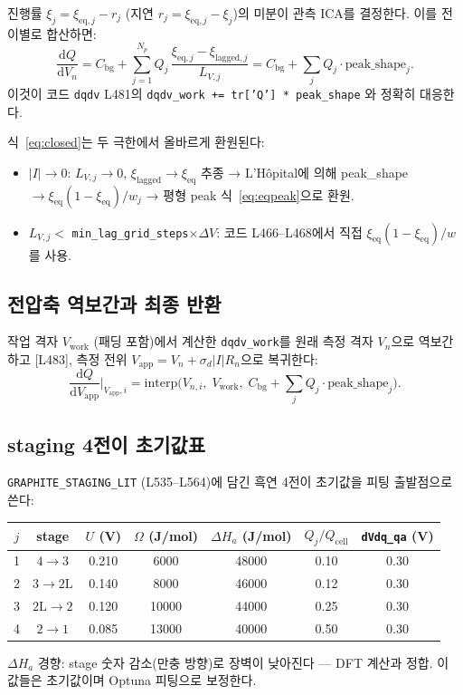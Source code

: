 \documentclass[11pt,a4paper]{article}
\newcommand{\dd}{\mathrm{d}}
\newcommand{\eq}{\mathrm{eq}}
\newcommand{\app}{\mathrm{app}}
\newcommand{\cell}{\mathrm{cell}}
\newcommand{\bg}{\mathrm{bg}}
\begin{document}
진행률 $\xi_j = \xi_{\eq,j} - r_j$ (지연 $r_j = \xi_{\eq,j}-\xi_j$)의 미분이
관측 ICA를 결정한다. 이를 전이별로 합산하면:
\begin{equation}
  \boxed{\frac{\dd Q}{\dd V_n} = C_\bg + \sum_{j=1}^{N_p} Q_j\,
  \frac{\xi_{\eq,j}-\xi_{\mathrm{lagged},j}}{L_{V,j}} = C_\bg + \sum_j Q_j\cdot\text{peak\_shape}_j.}
  \label{eq:closed}
\end{equation}
이것이 코드 \texttt{dqdv} L481의 \texttt{dqdv\_work += tr['Q'] * peak\_shape}
와 정확히 대응한다.

식~\eqref{eq:closed}는 두 극한에서 올바르게 환원된다:
\begin{itemize}[leftmargin=1.8em,itemsep=2pt]
\item $|I|\to0$: $L_{V,j}\to0$, $\xi_{\mathrm{lagged}}\to\xi_{\eq}$ 추종 → L'Hôpital에 의해
  peak\_shape $\to \xi_{\eq}(1-\xi_{\eq})/w_j$ → 평형 peak 식~\eqref{eq:eqpeak}으로 환원.
\item $L_{V,j} < $ \texttt{min\_lag\_grid\_steps}$\times\Delta V$:
  코드 L466--L468에서 직접 $\xi_{\eq}(1-\xi_{\eq})/w$를 사용.
\end{itemize}

\subsection{전압축 역보간과 최종 반환}

작업 격자 $V_\mathrm{work}$ (패딩 포함)에서 계산한 \texttt{dqdv\_work}를
원래 측정 격자 $V_n$으로 역보간하고 [L483],
측정 전위 $V_\app = V_n + \sigma_d|I|R_n$으로 복귀한다:
\begin{equation}
  \frac{\dd Q}{\dd V_\app}\bigg|_{V_\app,i}
  = \mathrm{interp}\!\Big(V_{n,i},\;V_\mathrm{work},\;
    C_\bg + \sum_j Q_j\cdot\text{peak\_shape}_j\Big).
  \label{eq:interp}
\end{equation}

\subsection{staging 4전이 초기값표}

\texttt{GRAPHITE\_STAGING\_LIT} (L535--L564)에 담긴 흑연 4전이
초기값을 피팅 출발점으로 쓴다:

\begin{center}
\renewcommand{\arraystretch}{1.35}
\begin{tabular}{ccccccc}
\toprule
$j$ & stage & $U$ (V) & $\Omega$ (J/mol) & $\Delta H_a$ (J/mol) & $Q_j/Q_\cell$
  & \texttt{dVdq\_qa} (V) \\
\midrule
1 & $4\to3$ & 0.210 & 6000 & 48000 & 0.10 & 0.30 \\
2 & $3\to2\mathrm{L}$ & 0.140 & 8000 & 46000 & 0.12 & 0.30 \\
3 & $2\mathrm{L}\to2$ & 0.120 & 10000 & 44000 & 0.25 & 0.30 \\
4 & $2\to1$ & 0.085 & 13000 & 40000 & 0.50 & 0.30 \\
\bottomrule
\end{tabular}
\end{center}
$\Delta H_a$ 경향: stage 숫자 감소(만충 방향)로 장벽이 낮아진다 — DFT 계산과 정합.
이 값들은 초기값이며 Optuna 피팅으로 보정한다.
\end{document}
